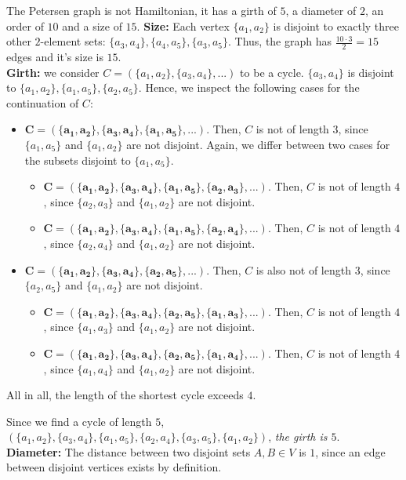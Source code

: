 \documentclass[a4paper]{article}
\begin{document}
\begin{solution}{9}
\begin{theorem}{The Petersen graph is not Hamiltonian, it has a girth of $5$, a diameter of $2$, an order of $10$ and a size of $15$.}
			\textbf{Size:} Each vertex $\{a_1, a_2\}$ is disjoint to exactly three other $2$-element sets: $\{a_3, a_4\}, \{a_4, a_5\}, \{a_3, a_5\}$. Thus, the graph has $\frac{10 \cdot 3}{2} = 15$ edges and it's size is $15$.\\

			\textbf{Girth:} we consider $C = (\{a_1, a_2\}, \{a_3, a_4\}, ...)$ to be a cycle. $\{a_3, a_4\}$ is disjoint to $\{a_1, a_2\}, \{a_1, a_5\}, \{a_2, a_5\}$. Hence, we inspect the following cases for the continuation of $C$:
			\begin{itemize}
				\item $\mathbf{C = (\{a_1, a_2\}, \{a_3, a_4\}, \{a_1, a_5\}, ...)}$. Then, $C$ is not of length $3$, since $\{a_1, a_5\}$ and $\{a_1, a_2\}$ are not disjoint. Again, we differ between two cases for the subsets disjoint to $\{a_1, a_5\}$.
					\begin{itemize}
						\item $\mathbf{C = (\{a_1, a_2\}, \{a_3, a_4\}, \{a_1, a_5\}, \{a_2, a_3\}, ...)}$. Then, $C$ is not of length $4$, since $\{a_2, a_3\}$ and $\{a_1, a_2\}$ are not disjoint.
						\item $\mathbf{C = (\{a_1, a_2\}, \{a_3, a_4\}, \{a_1, a_5\}, \{a_2, a_4\}, ...)}$. Then, $C$ is not of length $4$, since $\{a_2, a_4\}$ and $\{a_1, a_2\}$ are not disjoint.
					\end{itemize}
				\item $\mathbf{C = (\{a_1, a_2\}, \{a_3, a_4\}, \{a_2, a_5\}, ...)}$. Then, $C$ is also not of length $3$, since $\{a_2, a_5\}$ and $\{a_1, a_2\}$ are not disjoint.
					\begin{itemize}
						\item $\mathbf{C = (\{a_1, a_2\}, \{a_3, a_4\}, \{a_2, a_5\}, \{a_1, a_3\}, ...)}$. Then, $C$ is not of length $4$, since $\{a_1, a_3\}$ and $\{a_1, a_2\}$ are not disjoint.
						\item $\mathbf{C = (\{a_1, a_2\}, \{a_3, a_4\}, \{a_2, a_5\}, \{a_1, a_4\}, ...)}$. Then, $C$ is not of length $4$, since $\{a_1, a_4\}$ and $\{a_1, a_2\}$ are not disjoint.
					\end{itemize}
			\end{itemize}
			All in all, the length of the shortest cycle exceeds $4$.

			Since we find a cycle of length $5$, $(\{a_1, a_2\}, \{a_3, a_4\}, \{a_1, a_5\}, \{a_2, a_4\}, \{a_3, a_5\}, \{a_1, a_2\})$, \emph{the girth is $5$}.\\

			\textbf{Diameter:} The distance between two disjoint sets $A, B \in V$ is $1$, since an edge between disjoint vertices exists by definition.
				

\end{theorem}
\end{solution}
\end{document}

